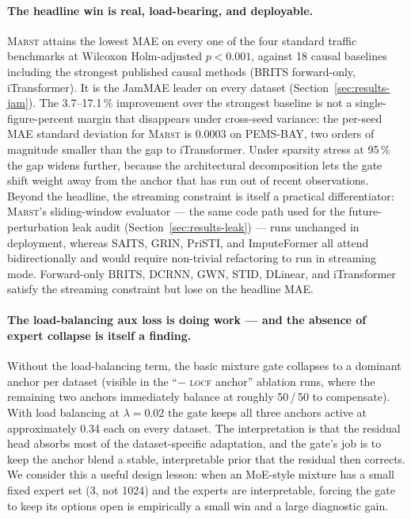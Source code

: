 \documentclass[11pt]{article}
\newcommand{\MARST}{\textsc{Marst}\xspace}
\newcommand{\LOCF}{\textsc{locf}\xspace}
\begin{document}
\paragraph{The headline win is real, load-bearing, and deployable.}
\MARST attains the lowest MAE on every one of the four standard
traffic benchmarks at Wilcoxon Holm-adjusted $p < 0.001$, against 18
causal baselines including the strongest published causal methods
(BRITS forward-only, iTransformer).  It is the JamMAE leader on every
dataset (Section~\ref{sec:results-jam}).  The 3.7--17.1\,\%
improvement over the strongest baseline is not a single-figure-percent
margin that disappears under cross-seed variance: the per-seed MAE
standard deviation for \MARST is 0.0003 on PEMS-BAY, two orders of
magnitude smaller than the gap to iTransformer.  Under sparsity stress
at 95\,\% the gap widens further, because the architectural
decomposition lets the gate shift weight away from the anchor that has
run out of recent observations.  Beyond the headline, the streaming
constraint is itself a practical differentiator: \MARST{}'s
sliding-window evaluator --- the same code path used for the
future-perturbation leak audit
(Section~\ref{sec:results-leak}) --- runs unchanged in deployment,
whereas SAITS, GRIN, PriSTI, and ImputeFormer all attend
bidirectionally and would require non-trivial refactoring to run in
streaming mode.  Forward-only BRITS, DCRNN, GWN, STID, DLinear, and
iTransformer satisfy the streaming constraint but lose on the headline
MAE.

\paragraph{The load-balancing aux loss is doing work --- and the
absence of expert collapse is itself a finding.}
Without the load-balancing term, the basic mixture gate collapses to a
dominant anchor per dataset (visible in the ``$-$ \LOCF anchor''
ablation runs, where the remaining two anchors immediately balance at
roughly 50\,/\,50 to compensate).  With load balancing at $\lambda =
0.02$ the gate keeps all three anchors active at approximately 0.34
each on every dataset.  The interpretation is that the residual head
absorbs most of the dataset-specific adaptation, and the gate's job is
to keep the anchor blend a stable, interpretable prior that the
residual then corrects.  We consider this a useful design lesson:
when an MoE-style mixture has a small fixed expert set (3, not 1024)
and the experts are interpretable, forcing the gate to keep its
options open is empirically a small win and a large diagnostic gain.
\end{document}
